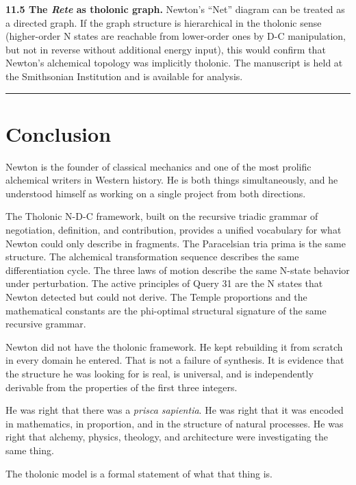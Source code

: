 \documentclass[12pt]{article}
\begin{document}
\textbf{11.5 The \emph{Rete} as tholonic graph.} Newton's ``Net''
diagram can be treated as a directed graph. If the graph structure is
hierarchical in the tholonic sense (higher-order N states are reachable
from lower-order ones by D-C manipulation, but not in reverse without
additional energy input), this would confirm that Newton's alchemical
topology was implicitly tholonic. The manuscript is held at the
Smithsonian Institution and is available for analysis.

\begin{center}\rule{0.5\linewidth}{0.5pt}\end{center}

\section{Conclusion}\label{conclusion}

Newton is the founder of classical mechanics and one of the most
prolific alchemical writers in Western history. He is both things
simultaneously, and he understood himself as working on a single project
from both directions.

The Tholonic N-D-C framework, built on the recursive triadic grammar of
negotiation, definition, and contribution, provides a unified vocabulary
for what Newton could only describe in fragments. The Paracelsian tria
prima is the same structure. The alchemical transformation sequence
describes the same differentiation cycle. The three laws of motion
describe the same N-state behavior under perturbation. The active
principles of Query 31 are the N states that Newton detected but could
not derive. The Temple proportions and the mathematical constants are
the phi-optimal structural signature of the same recursive grammar.

Newton did not have the tholonic framework. He kept rebuilding it from
scratch in every domain he entered. That is not a failure of synthesis.
It is evidence that the structure he was looking for is real, is
universal, and is independently derivable from the properties of the
first three integers.

He was right that there was a \emph{prisca sapientia}. He was right that
it was encoded in mathematics, in proportion, and in the structure of
natural processes. He was right that alchemy, physics, theology, and
architecture were investigating the same thing.

The tholonic model is a formal statement of what that thing is.
\end{document}
